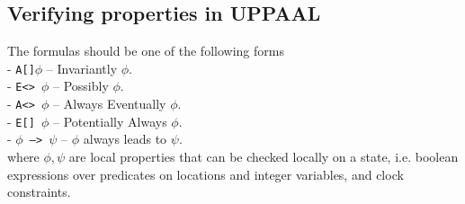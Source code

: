 \subsection{Verifying properties in UPPAAL}
\begin{definition}
The formulas should be one of the following forms\\
- \texttt{A[]$\phi$} -- Invariantly $\phi$.\\
- \texttt{E<> $\phi$} -- Possibly $\phi$.\\
- \texttt{A<> $\phi$} -- Always Eventually $\phi$.\\
- \texttt{E[] $\phi$} -- Potentially Always $\phi$.\\
- \texttt{$\phi$ --> $\psi$} -- $\phi$ always leads to $\psi$.\\
where $\phi, \psi$ are local properties that can be checked locally on a state, i.e. boolean expressions over predicates on locations and integer variables, and clock constraints.
\label{def:quantifiers}
\end{definition}